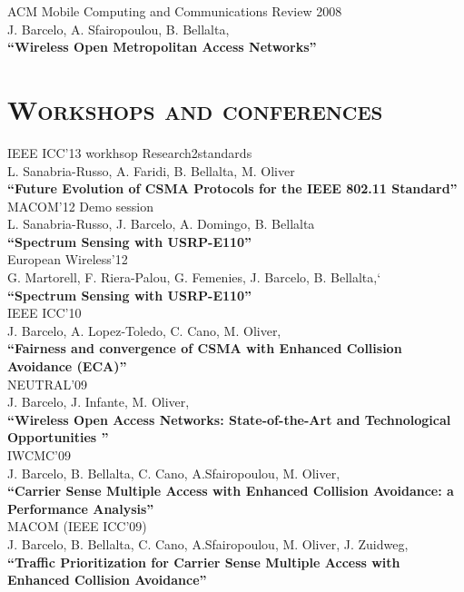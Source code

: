 \documentclass[line,margin]{res}
\begin{document}
\begin{resume}
\hfill {ACM Mobile Computing and Communications Review 2008} \\
J. Barcelo, A. Sfairopoulou, B. Bellalta,\\
\textbf{``Wireless Open Metropolitan Access Networks''}\\

\section{\textsc{Workshops and conferences}}

\hfill {IEEE ICC'13 workhsop Research2standards} \\
L. Sanabria-Russo, A. Faridi, B. Bellalta, M. Oliver\\
\textbf{``Future Evolution of CSMA Protocols for the IEEE 802.11 Standard''}\\

\hfill {MACOM'12 Demo session} \\
L. Sanabria-Russo, J. Barcelo, A. Domingo, B. Bellalta\\
\textbf{``Spectrum Sensing with USRP-E110''}\\

\hfill {European Wireless'12} \\
G. Martorell, F. Riera-Palou, G. Femenies, J. Barcelo, B. Bellalta,`\\
\textbf{``Spectrum Sensing with USRP-E110''}\\

\hfill {IEEE ICC'10} \\
J. Barcelo, A. Lopez-Toledo,  C. Cano, M. Oliver,\\
\textbf{``Fairness and convergence of CSMA with Enhanced Collision Avoidance (ECA)''}\\

\hfill {NEUTRAL'09} \\
J. Barcelo,  J. Infante, M. Oliver,\\
\textbf{``Wireless Open Access Networks: State-of-the-Art and Technological Opportunities ''}\\

\hfill {IWCMC'09} \\
J. Barcelo, B. Bellalta,  C. Cano, A.Sfairopoulou, M. Oliver,\\
\textbf{``Carrier Sense Multiple Access with Enhanced Collision Avoidance: a Performance Analysis''}\\

\hfill {MACOM (IEEE ICC'09)} \\
J. Barcelo, B. Bellalta,  C. Cano, A.Sfairopoulou, M. Oliver, J. Zuidweg,\\
\textbf{``Traffic Prioritization for Carrier Sense Multiple Access with Enhanced Collision Avoidance''}\\


\end{resume}
\end{document}
